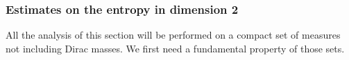 \documentclass[11pt,a4paper]{article}
\numberwithin{equation}{section}
\newcommand{\R}{{\mathbb{R}}}
\theoremstyle{plain}
\theoremstyle{remark}
\newcommand {\f}{\frac}
\begin{document}
% 
%


\subsubsection{Estimates on the entropy in dimension 2}\label{sec:Estimates entropy}

All the analysis of this section will be performed on a compact set of measures not including Dirac masses. We first need a fundamental property of those sets.
\end{document}
